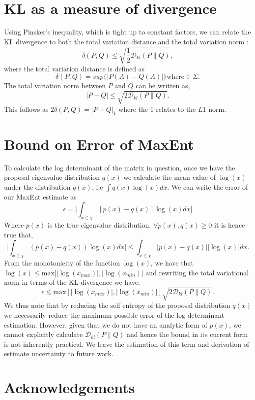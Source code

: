 \documentclass[letterpaper]{article} %
\begin{document}
\section{KL as a measure of divergence}
Using Pinsker's inequality, which is tight up to constant factors, we can relate the KL divergence to both the total variation distance and the total variation norm \cite{cover2012elements}:
\begin{equation}
\delta(P,Q) \leq \sqrt{\frac{1}{2}\mathcal{D}_{kl}(P\|Q)},
\end{equation}
where the total variation distance is defined as
\begin{equation}
\delta(P,Q) = sup \{|P(A)-Q(A)|\} \text{where} \in \Sigma. 
\end{equation}
The total variation norm between $P$ and $Q$ can be written as,
\begin{equation}
|P-Q| \leq \sqrt{2\mathcal{D}_{kl}(P\|Q)}.
\end{equation}
This follows as $2\delta(P,Q) = |P-Q|_{1}$ where the 1 relates to the $L{1}$ norm.

\section{Bound on Error of MaxEnt}
To calculate the log determinant of the matrix in question, once we have the proposal eigenvalue distribution $q(x)$ we calculate the mean value of $\log(x)$ under the distribution $q(x)$, i.e $\int q(x)\log(x)dx$. We can write the error of our MaxEnt estimate as
\begin{equation}
\epsilon = \biggl| \int_{x\in \chi}[p(x)-q(x)]\log(x)dx\biggr|
\end{equation}
Where $p(x)$ is the true eigenvalue distribution. $\forall p(x),q(x) \geq 0$ it is hence true that,
\begin{equation}
\biggl|\int_{x\in \chi}(p(x)-q(x))\log(x)dx\biggr| \leq  \int_{x\in \chi} |p(x)-q(x)||\log(x)| dx.
\end{equation}
From the monotonicity of the function $\log(x)$, we have that  $\log(x) \leq \mbox{max}[|\log(x_{max})|,|\log(x_{min})|$ and rewriting the total variational norm in terms of the KL divergence we have:
\begin{equation}
\label{errorequation}
\epsilon \leq \mbox{max}[|\log(x_{max})|,|\log(x_{min})|]\sqrt{2\mathcal{D}_{kl}(P\|Q)}.
\end{equation}
We thus note that by reducing the self entropy of the proposal distribution $q(x)$ we necessarily reduce the maximum possible error of the log determinant estimation. However, given that we do not have an analytic form of $p(x)$, we cannot explicitly calculate $\mathcal{D}_{kl}(P\|Q)$ and hence the bound in its current form is not inherently practical. We leave the estimation of this term and derivation of estimate uncertainty to future work.

\section*{Acknowledgements}







\end{document}
